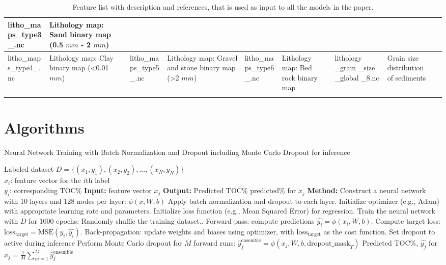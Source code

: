 \documentclass[journal abbreviation, manuscript]{copernicus}
\begin{document}
\begin{longtable}{|p{}|p{}|p{}|}
        \hline 
        litho\_maps\_type3\_.nc & Lithology map: Sand binary map (0.5 $mm$ - 2 $mm$) & \cite{garlan2018} \\
        \hline 
        litho\_maps\_type4\_.nc & Lithology map: Clay binary map (<0.01 $mm$) & \cite{garlan2018}
        \hline 
        litho\_maps\_type5\_.nc & Lithology map: Gravel and stone binary map (>2 $mm$) & \cite{garlan2018}
        \hline 
        litho\_maps\_type6\_.nc & Lithology map: Bed rock binary map & \cite{garlan2018}
        \hline 
        lithology \_grain \_size \_global \_8.nc & Grain size distribution of sediments & \cite{garlan2018} \\
        \hline 
\caption{Feature list with description and references, that is used as input to all the models in the paper.}
\label{tab:myfirstlongtable}
\end{longtable}





\newpage
\section{Algorithms}
\begin{algorithm}
\caption{Neural Network Training with Batch Normalization and Dropout including Monte Carlo Dropout for inference}
\label{a2}
\begin{algorithmic}[1]
\REQUIRE Labeled dataset $D = \{(x_1, y_1), (x_2, y_2), ..., (x_N, y_N)\}$ \\
\hspace{13mm} $x_i$: feature vector for the $i$th label \\
\hspace{13mm} $y_i$: corresponding TOC\%
\STATE \textbf{Input:} feature vector $x_j$
\STATE \textbf{Output:} Predicted TOC\% $\text{predicted\%}$ for $x_j$
\STATE \textbf{Method:} Construct a neural network with 10 layers and 128 nodes per layer: $\phi(x, W, b)$
\STATE Apply batch normalization and dropout to each layer.
\STATE Initialize optimizer (e.g., Adam) with appropriate learning rate and parameters.
\STATE Initialize loss function (e.g., Mean Squared Error) for regression.
\STATE Train the neural network with $D$ for 1000 epochs:
    \STATE Randomly shuffle the training dataset..
        \STATE Forward pass: compute predictions $\hat{y_i} = \phi(x_i, W, b)$.
        \STATE Compute target loss: $\text{loss}_{\text{target}} = \text{MSE}(y_i, \hat{y_i})$.
        \STATE Back-propagation: update weights and biases using optimizer, with $\text{loss}_{\text{target}}$ as the cost function.
    \ENDFOR
\ENDFOR
\STATE Set dropout to active during inference
\STATE Perform Monte Carlo dropout for $M$ forward runs:
\STATE \hspace{5mm} $\hat{y}^{\text{ensemble}}_j =  \phi(x_j, W, b, \text{dropout\_mask}_T)$
\STATE Predicted TOC\%, $\hat{y_j}$ for $x_j = \frac{1}{M}  \sum_{m=1}^{M} \hat{y}^{\text{ensemble}}_j$
\end{algorithmic}
\end{algorithm}
\end{document}
